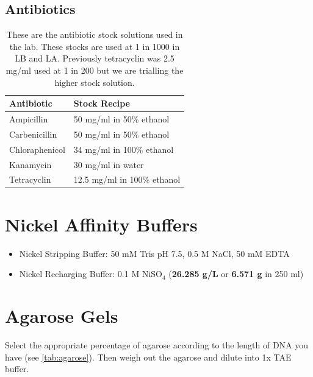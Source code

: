 \documentclass{tufte-book} %
\begin{document}
\newpage

\subsection{Antibiotics}

\begin{table}[ht]
  \centering
  \selectfont
  \begin{tabular}{ll}
    \toprule
    Antibiotic & Stock Recipe \\
    \midrule
    
    Ampicillin 		& 50 mg/ml in 50\% ethanol \\    
    Carbenicillin 		& 50 mg/ml in 50\% ethanol \\
    Chloraphenicol 	& 34 mg/ml in 100\% ethanol\\
    Kanamycin 		& 30 mg/ml in water \\
    Tetracyclin 		& 12.5 mg/ml in 100\% ethanol \\

    \bottomrule
  \end{tabular}
  \caption{These are the antibiotic stock solutions used in the lab. These stocks are used at 1 in 1000 in LB and LA. Previously tetracyclin was 2.5 mg/ml used at 1 in 200 but we are trialling the higher stock solution.}
  \label{tab:buffers}
\end{table}

\newpage
\section{Nickel Affinity Buffers}

\begin{itemize}
\item Nickel Stripping Buffer: 50 mM Tris pH 7.5, 0.5 M NaCl, 50 mM EDTA
\item Nickel Recharging Buffer: 0.1 M NiSO$_{4}$ (\textbf{26.285 g/L} or \textbf{6.571 g} in 250 ml)
\end{itemize}

\newpage
\section{Agarose Gels}

Select the appropriate percentage of agarose according to the length of DNA you have (see \ref{tab:agarose}). Then weigh out the agarose and dilute into 1x TAE buffer.
\end{document}
